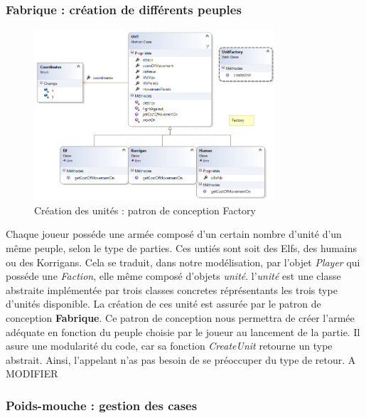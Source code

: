 		\subsubsection{Fabrique : création de différents peuples}

		\begin{figure}[h]
			\begin{center}
				\includegraphics[width=0.8\textwidth]{figure/factory.png}
			\end{center}
			\caption{Création des unités : patron de conception Factory}
			\label{fig:strategy}
		\end{figure}

		Chaque joueur posséde une armée composé d'un certain nombre d'unité d'un même peuple, selon le type de parties. Ces untiés sont soit des Elfs, des humains ou des Korrigans. Cela se traduit, dans notre modélisation, par l'objet \emph{Player} qui posséde une \emph{Faction}, elle même composé d'objets \emph{unité}. l'\emph{unité} est une classe abstraite implémentée par trois classes concretes réprésentants les trois type d'unités disponible. La création de ces unité est assurée par le patron de conception \textbf{Fabrique}. Ce patron de conception nous permettra de créer l'armée adéquate en fonction du peuple choisie par le joueur au lancement de la partie. Il asure une modularité du code, car sa fonction \emph{CreateUnit} retourne un type abstrait. Ainsi, l'appelant n'as pas besoin de se préoccuper du type de retour.  A MODIFIER



		\subsubsection{Poids-mouche : gestion des cases}

